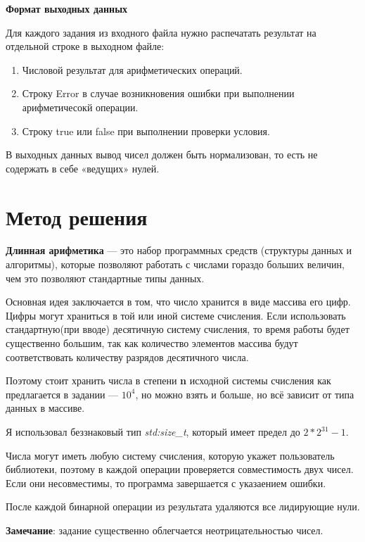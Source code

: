 \documentclass[pdf, unicode, 12pt, a4paper,oneside,fleqn]{article}
\begin{document}
{{\bf Формат выходных данных}

Для каждого задания из входного файла нужно распечатать результат на отдельной строке в выходном файле:
\begin{enumerate}
    \item Числовой результат для арифметических операций.
    \item Строку Error в случае возникновения ошибки при выполнении арифметичесокй операции.
    \item Строку true или false при выполнении проверки условия.
\end{enumerate}

В выходных данных вывод чисел должен быть нормализован, то есть не содержать в себе «ведущих» нулей.

}

\pagestyle{plain}
\pagebreak
\section{Метод решения}
{\bf Длинная арифметика} — это набор программных средств (структуры данных и алгоритмы), которые позволяют работать с числами гораздо больших величин, чем это позволяют стандартные типы данных.

Основная идея заключается в том, что число хранится в виде массива его цифр. Цифры могут храниться в той или иной системе счисления. Если использовать стандартную(при вводе) десятичную систему счисления, то время работы будет существенно большим, так как количество элементов массива будут соответствовать количеству разрядов десятичного числа. 

Поэтому стоит хранить числа в степени {\bf n} исходной системы счисления как предлагается в задании — $10^4$, но можно взять и больше, но всё зависит от типа данных в массиве.

Я использовал беззнаковый тип {\it std:size\_t}, который имеет предел до $2*2^{31} - 1$.

Числа могут иметь любую систему счисления, которую укажет пользователь библиотеки, поэтому в каждой операции проверяется совместимость двух чисел. Если они несовместимы, то программа завершается с указаением ошибки.

После каждой бинарной операции из результата удаляются все лидирующие нули.

{\bf Замечание}: задание существенно облегчается неотрицательностью чисел.
\end{document}
